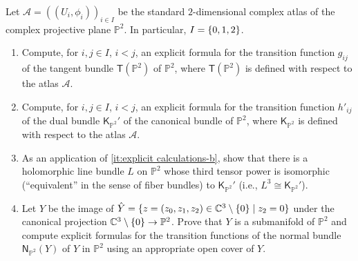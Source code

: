 \documentclass[a4paper]{amsart}
\newcommand{\C}{\mathbb{C}}
\newcommand{\TB}[1]{\mathsf{T}(#1)}
\newcommand{\KB}[1]{\mathsf{K}_{#1}}
\newcommand{\NB}[2]{\mathsf{N}_{#2}(#1)}
\renewcommand{\P}{\mathbb{P}}
\theoremstyle{remark}
\numberwithin{equation}{question}
\DeclarePairedDelimiter\set{\{}{\}}
\begin{document}
\begin{question}[subtitle=Explicit calculations with vector bundles on $\P^2$]
\label{qu:explicit calculations}
Let $\mathcal A = ((U_i,\phi_i))_{i \in I}$ be the standard $2$-dimensional complex atlas of the complex projective plane $\P^2$. In particular, $I = \set{0,1,2}$.
\begin{enumerate}
\item \label{it:explicit calculations-a} Compute, for $i,j \in I$, $i<j$, an explicit formula for the transition function $g_{ij}$ of the tangent bundle $\TB{\P^2}$ of $\P^2$, where $\TB{\P^2}$ is defined with respect to the atlas $\mathcal A$.
\item \label{it:explicit calculations-b} Compute, for $i,j \in I$, $i<j$, an explicit formula for the transition function $h'_{ij}$ of the dual bundle $\KB{\P^2}'$ of the canonical bundle of $\P^2$, where $\KB{\P^2}$ is defined with respect to the atlas $\mathcal A$.
\item As an application of \cref{it:explicit calculations-b}, show that there is a holomorphic line bundle $L$ on $\P^2$ whose third tensor power is isomorphic (“equivalent” in the sense of fiber bundles) to $\KB{\P^2}'$ (i.e., $L^3 \cong \KB{\P^2}'$).
\item Let $Y$ be the image of $\hat Y = \set{z = (z_0,z_1,z_2) \in \C^3 \setminus \set0 \mid z_2=0}$ under the canonical projection $\C^3 \setminus \set0 \to \P^2$. Prove that $Y$ is a submanifold of $\P^2$ and compute explicit formulas for the transition functions of the normal bundle $\NB Y{\P^2}$ of $Y$ in $\P^2$ using an appropriate open cover of $Y$.
\end{enumerate}
\end{question}
\end{document}
